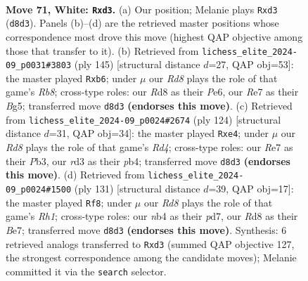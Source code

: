 \documentclass[11pt]{article}
\begin{document}
\clearpage

\begin{figure}[p]\centering
\begin{subfigure}{0.46\textwidth}\centering
\resizebox{\linewidth}{!}{%
\newchessgame
\chessboard[
  setfen={3R4/1p2R2p/1k4pP/5p2/pn3P2/3r4/7K/8 w - - 6 71},
  showmover=false,
  pgfstyle=straightmove, color=movearrow, markmove={d8-d3}
]}
\caption{}
\end{subfigure}\hfill
\begin{subfigure}{0.46\textwidth}\centering
\resizebox{\linewidth}{!}{%
\newchessgame
\chessboard[
  setfen={8/3N1k2/1R2p3/p5bp/P7/4PK2/5P2/1r6 b - - 0 73},
  showmover=false,
  pgfstyle=straightmove, color=movearrow, markmove={b1-b6}
]}
\caption{}
\end{subfigure}
\\[4pt]
\begin{subfigure}{0.46\textwidth}\centering
\resizebox{\linewidth}{!}{%
\newchessgame
\chessboard[
  setfen={5K2/6pk/5p2/5Prp/1p1Rp3/1P6/8/8 w - - 0 63},
  showmover=false,
  pgfstyle=straightmove, color=movearrow, markmove={d4-e4}
]}
\caption{}
\end{subfigure}\hfill
\begin{subfigure}{0.46\textwidth}\centering
\resizebox{\linewidth}{!}{%
\newchessgame
\chessboard[
  setfen={4R2r/1P1Pb2k/8/p5P1/P3P3/5PB1/6K1/8 b - - 0 66},
  showmover=false,
  pgfstyle=straightmove, color=movearrow, markmove={h8-f8}
]}
\caption{}
\end{subfigure}
\caption{\textbf{Move 71, White: \texttt{Rxd3}.} (a) Our position; Melanie plays \texttt{Rxd3} (\texttt{d8d3}). Panels (b)--(d) are the retrieved master positions whose correspondence most drove this move (highest QAP objective among those that transfer to it). (b) Retrieved from \texttt{lichess\_elite\_2024-09\_p0031\#3803} (ply 145) [structural distance $d$=27, QAP obj=53]: the master played \texttt{Rxb6}; under $\mu$ our \emph{Rd8} plays the role of that game's \emph{Rb8}; cross-type roles: our \emph{R}d8 as their \emph{P}e6, our \emph{R}e7 as their \emph{B}g5; transferred move \texttt{d8d3} \textbf{(endorses this move)}. (c) Retrieved from \texttt{lichess\_elite\_2024-09\_p0024\#2674} (ply 124) [structural distance $d$=31, QAP obj=34]: the master played \texttt{Rxe4}; under $\mu$ our \emph{Rd8} plays the role of that game's \emph{Rd4}; cross-type roles: our \emph{R}e7 as their \emph{P}b3, our \emph{r}d3 as their \emph{p}b4; transferred move \texttt{d8d3} \textbf{(endorses this move)}. (d) Retrieved from \texttt{lichess\_elite\_2024-09\_p0024\#1500} (ply 131) [structural distance $d$=39, QAP obj=17]: the master played \texttt{Rf8}; under $\mu$ our \emph{Rd8} plays the role of that game's \emph{Rh1}; cross-type roles: our \emph{n}b4 as their \emph{p}d7, our \emph{R}d8 as their \emph{B}e7; transferred move \texttt{d8d3} \textbf{(endorses this move)}. Synthesis: 6 retrieved analogs transferred to \texttt{Rxd3} (summed QAP objective 127, the strongest correspondence among the candidate moves); Melanie committed it via the \texttt{search} selector.}
\label{fig:thought-m140}
\end{figure}
\end{document}
